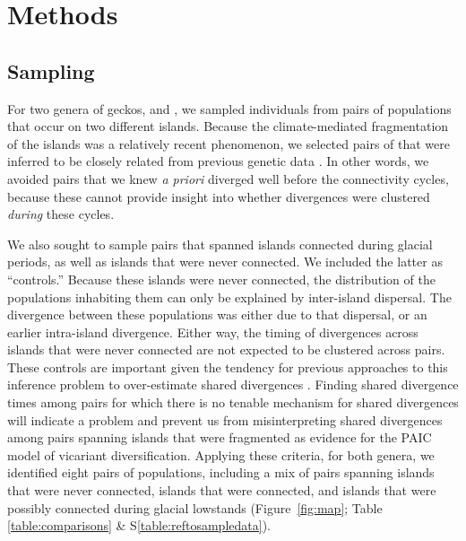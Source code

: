 \section{Methods}

\subsection{Sampling}
For two genera of geckos,  and , we sampled
individuals from pairs of populations that occur on two different islands.
Because the climate-mediated fragmentation of the islands was a relatively
recent phenomenon, we selected  pairs of
 that were inferred to be closely related
from previous genetic data
\citep{Siler2012, Siler2014kikuchii, Welton2010, Welton2010zootaxa, Siler2010}.
In other words, we avoided pairs that we knew \emph{a priori} diverged well
before the connectivity cycles, because these cannot provide insight into
whether divergences were clustered \emph{during} these cycles.


We also sought to sample pairs that spanned islands connected during glacial
periods, as well as islands that were never connected.
We included the latter as ``controls.''
Because these islands were never connected, the distribution of the populations
inhabiting them can only be explained by inter-island dispersal.
The divergence between these populations was either due to that
dispersal, or an earlier intra-island divergence.
Either way, the timing of divergences across islands that were never connected
are not expected to be clustered across pairs.
These controls are important given the tendency for previous approaches to this
inference problem to over-estimate shared divergences
\citep{Oaks2012,Oaks2014reply}.
Finding shared  divergence times among pairs for which there is no
tenable mechanism for shared divergences will indicate a problem and prevent us
from misinterpreting shared divergences among pairs spanning islands that were
fragmented as evidence for the PAIC model of vicariant diversification.
Applying these criteria, for both genera, we identified eight pairs of
populations, including a mix of pairs spanning islands that were never
connected, islands that were connected, and islands that were possibly
connected during glacial lowstands
(Figure~\ref{fig:map};
Table \ref{table:comparisons} \& S\ref{table:reftosampledata}).

